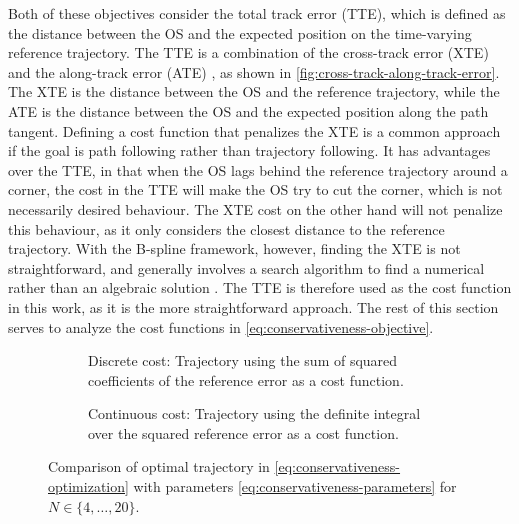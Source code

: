 Both of these objectives consider the total track error (TTE), which is defined as the distance between the OS and the expected position on the time-varying reference trajectory. The TTE is a combination of the cross-track error (XTE) and the along-track error (ATE) \citep{Fossen2011-Handbook}, as shown in \cref{fig:cross-track-along-track-error}. The XTE is the distance between the OS and the reference trajectory, while the ATE is the distance between the OS and the expected position along the path tangent. Defining a cost function that penalizes the XTE is a common approach if the goal is path following rather than trajectory following. It has advantages over the TTE, in that when the OS lags behind the reference trajectory around a corner, the cost in the TTE will make the OS try to cut the corner, which is not necessarily desired behaviour. The XTE cost on the other hand will not penalize this behaviour, as it only considers the closest distance to the reference trajectory. 
With the B-spline framework, however, finding the XTE is not straightforward, and generally involves a search algorithm to find a numerical rather than an algebraic solution \citep{johnson2005distance,hu2005second,chen2009computing}. The TTE is therefore used as the cost function in this work, as it is the more straightforward approach. The rest of this section serves to analyze the cost functions in \cref{eq:conservativeness-objective}.

\begin{figure}
    \centering
    \begin{subfigure}[b]{\textwidth}
    \centering
    
        \caption{Discrete cost: Trajectory using the sum of squared coefficients of the reference error as a cost function.}
        \label{fig:conservativeness-traj-coeffs}
    \end{subfigure}
    \hfill
    \begin{subfigure}[b]{\textwidth}
        \centering
        
        \caption{Continuous cost: Trajectory using the definite integral over the squared reference error as a cost function.}
        \label{fig:conservativeness-traj-integral}
    \end{subfigure}
    \caption{Comparison of optimal trajectory in \cref{eq:conservativeness-optimization} with parameters \cref{eq:conservativeness-parameters} for $N\in\{4,\ldots,20\}$.}
    \label{fig:conservativeness-traj}
\end{figure}


